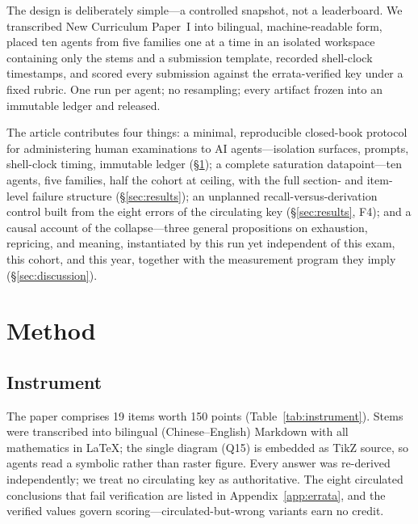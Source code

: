 \documentclass[11pt]{article}
\theoremstyle{plain}
\newcommand{\Q}[1]{Q#1}
\begin{document}
The design is deliberately simple---a controlled snapshot, not a
leaderboard. We transcribed New Curriculum Paper~I into bilingual,
machine-readable form, placed ten agents from five families one at a time
in an isolated workspace containing only the stems and a submission
template, recorded shell-clock timestamps, and scored every submission
against the errata-verified key under a fixed rubric. One run per agent;
no resampling; every artifact frozen into an immutable ledger and
released.

The article contributes four things: a minimal, reproducible
closed-book protocol for administering human examinations to AI
agents---isolation surfaces, prompts, shell-clock timing, immutable
ledger (\S\ref{sec:method}); a complete saturation datapoint---ten
agents, five families, half the cohort at ceiling, with the full
section- and item-level failure structure (\S\ref{sec:results}); an
unplanned recall-versus-derivation control built from the eight errors
of the circulating key (\S\ref{sec:results}, F4); and a causal account
of the collapse---three general propositions on exhaustion, repricing,
and meaning, instantiated by this run yet independent of this exam,
this cohort, and this year, together with the measurement program they
imply (\S\ref{sec:discussion}).

\section{Method}
\label{sec:method}

\subsection{Instrument}

The paper comprises 19 items worth 150 points
(Table~\ref{tab:instrument}). Stems were transcribed into bilingual
(Chinese--English) Markdown with all mathematics in LaTeX; the single
diagram (\Q{15}) is embedded as TikZ source, so agents read a symbolic
rather than raster figure. Every answer was re-derived independently; we
treat no circulating key as authoritative. The eight circulated
conclusions that fail verification are listed in
Appendix~\ref{app:errata}, and the verified values govern
scoring---circulated-but-wrong variants earn no credit.
\end{document}
